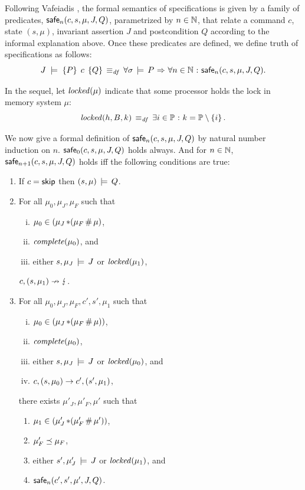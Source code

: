 \documentclass[11pt]{report}
\begin{document}
Following Vafeiadis \cite{V11}, the formal semantics of specifications is given by a family of predicates, $\mathsf{safe}_{n}(c,s,\mu,J,Q)$, parametrized by $n \in \mathbb{N}$, that relate a command $c$, state $(s,\mu)$, invariant assertion $J$ and postcondition $Q$ according to the informal explanation above. Once these predicates are defined, we define truth of specifications as follows: \[ J\;\models\;\left\lbrace P \right\rbrace\;c\;\left\lbrace Q \right\rbrace \operatorname{\;\equiv_{\mathit{df}}\;} \forall \sigma \,\models\, P \operatorname{\,\Rightarrow\,} \forall n \in \mathbb{N} \operatorname{\,:\,} \mathsf{safe}_{n}(c,s,\mu,J,Q).\]

In the sequel, let $\mathit{locked}(\mu)$ indicate that some processor holds the lock in memory system $\mu$: \[ \mathit{locked}(h,B,k) \operatorname{\;\equiv_{\mathit{df}}\;} \exists i \in \mathbb{P} \operatorname{\,:\,} k = \mathbb{P} \setminus \left\lbrace i \right\rbrace. \]

We now give a formal definition of $\mathsf{safe}_{n}(c,s,\mu,J,Q)$ by natural number induction on $n$. $\mathsf{safe}_{0}(c,s,\mu,J,Q)$ holds always. And for $n \in \mathbb{N}$, $\mathsf{safe}_{n+1}(c,s,\mu,J,Q)$ holds iff the following conditions are true: \begin{enumerate}
	\item If $c = \operatorname{\mathsf{skip}}$ then $(s,\mu) \,\models\, Q$.

	\item For all $\mu_0,\mu_J,\mu_F$ such that \begin{enumerate}[(i)]
		\item $\mu_0 \in (\mu_J \operatorname{\ast} (\mu_F \operatorname{\#} \mu)$,
		\item $\mathit{complete}(\mu_0)$, and
		\item either $s,\mu_J \,\models\, J$ or $\mathit{locked}(\mu_1)$,
	\end{enumerate} $c,(s,\mu_1) \nrightarrow \lightning$.

	\item For all $\mu_0,\mu_J,\mu_F,c',s',\mu_1$ such that \begin{enumerate}[(i)]
		\item $\mu_0 \in (\mu_J \operatorname{\ast} (\mu_F \operatorname{\#} \mu))$,
		\item $\mathit{complete}(\mu_0)$,
		\item either $s,\mu_J \,\models\, J$ or $\mathit{locked}(\mu_0)$, and 
		\item $c,(s,\mu_0) \rightarrow c',(s',\mu_1)$,
	\end{enumerate} there exists $\mu'_J,\mu'_F,\mu'$ such that \begin{enumerate}
		\item $\mu_1 \in (\mu'_J \operatorname{\ast} (\mu'_F \operatorname{\#} \mu'))$,
		\item $\mu'_F \preceq \mu_F$,
		\item either $s',\mu'_J \,\models\, J$ or $\mathit{locked}(\mu_1)$, and
		\item $\mathsf{safe}_{n}(c',s',\mu',J,Q)$.
	\end{enumerate}

\end{enumerate}
\end{document}

